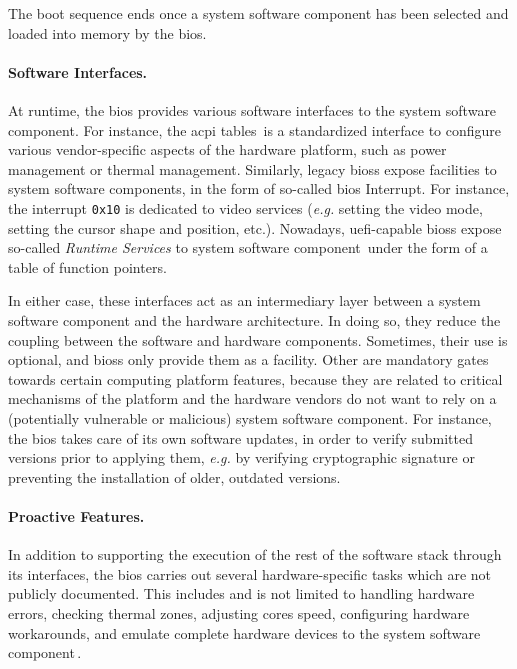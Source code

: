 The boot sequence ends once a system software component has been selected and
loaded into memory by the \ac{bios}.

\paragraph{Software Interfaces.}
At runtime, the \ac{bios} provides various software interfaces to the system
software component.
%
For instance, the \ac{acpi} tables\,\cite{uefi2017acpi,duflot2010acpi} is a
standardized interface to configure various vendor-specific aspects of the
hardware platform, such as power management or thermal management.
%
Similarly, legacy \acp{bios} expose facilities to system software components, in
the form of so-called \ac{bios} Interrupt.
%
For instance, the interrupt \texttt{0x10} is dedicated to video services
(\emph{e.g.} setting the video mode, setting the cursor shape and position,
etc.).
%
Nowadays, \ac{uefi}-capable \acp{bios} expose so-called \emph{Runtime Services}
to system software component\,\cite[Chapter 5]{zimmer2017uefi} under the form of
a table of function pointers.

In either case, these interfaces act as an intermediary layer between a system
software component and the hardware architecture.
%
In doing so, they reduce the coupling between the software and hardware
components.
%
Sometimes, their use is optional, and \acp{bios} only provide them as a
facility.
%
Other are mandatory gates towards certain computing platform features, because
they are related to critical mechanisms of the platform and the hardware vendors
do not want to rely on a (potentially vulnerable or malicious) system software
component.
%
For instance, the \ac{bios} takes care of its own software updates, in order to
verify submitted versions prior to applying them, \emph{e.g.} by verifying
cryptographic signature or preventing the installation of older, outdated
versions.

\paragraph{Proactive Features.}
%
In addition to supporting the execution of the rest of the software stack
through its interfaces, the \ac{bios} carries out several hardware-specific
tasks which are not publicly documented.
%
This includes and is not limited to handling hardware errors, checking thermal
zones, adjusting cores speed, configuring hardware workarounds, and emulate
complete hardware devices to the system software
component\,\cite{yao2009system}.

